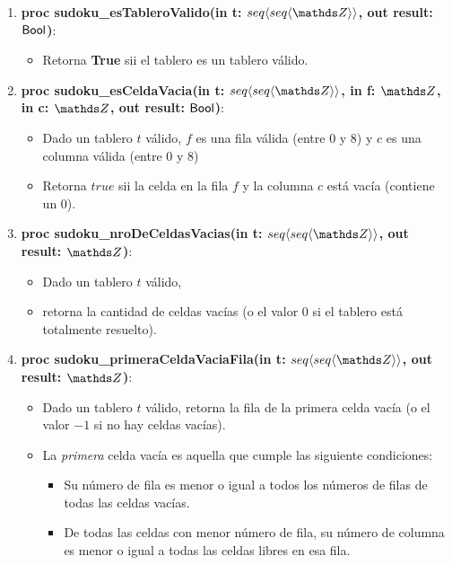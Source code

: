 \documentclass[spanish,a4paper]{article}
\begin{document}
\begin{enumerate}

\item \textbf{proc sudoku\_esTableroValido(in t: $\TLista{\TLista{\ent}}$, out result: $\mathsf{Bool}$)}:
\begin{itemize}
\item Retorna \textbf{True} sii el tablero es un tablero v\'alido.
\end{itemize}

\item \textbf{proc sudoku\_esCeldaVacia(in t: $\TLista{\TLista{\ent}}$, in f: $\ent$, in c: $\ent$, out result: $\mathsf{Bool}$)}:
\begin{itemize}
\item Dado un tablero $t$ v\'alido, $f$ es una fila v\'alida (entre 0 y 8) y $c$ es una columna v\'alida (entre 0 y 8)
\item Retorna $true$ sii  la celda en la fila $f$ y la columna $c$ est\'a vac\'ia (contiene un $0$).
\end{itemize}

\item \textbf{proc sudoku\_nroDeCeldasVacias(in t: $\TLista{\TLista{\ent}}$, out result: $\ent$)}:
\begin{itemize}
\item Dado un tablero $t$ v\'alido, 
\item retorna la cantidad de celdas vac\'ias (o el valor $0$ si el tablero est\'a totalmente resuelto).
\end{itemize}

\item \textbf{proc sudoku\_primeraCeldaVaciaFila(in t: $\TLista{\TLista{\ent}}$, out result: $\ent$)}:
\begin{itemize}
\item Dado un tablero $t$ v\'alido,  retorna la fila de la primera celda vac\'ia (o el valor $-1$ si no hay celdas vac\'ias).
\item La \emph{primera} celda vac\'ia es aquella que cumple las siguiente condiciones:
	\begin{itemize}
	\item Su n\'umero de fila es menor o igual a todos los n\'umeros de filas de todas las celdas vac\'ias.
	\item De todas las celdas con menor n\'umero de fila, su n\'umero de columna es menor o igual a todas las celdas libres en esa fila.
	\end{itemize}  
\end{itemize}


\end{enumerate}
\end{document}
